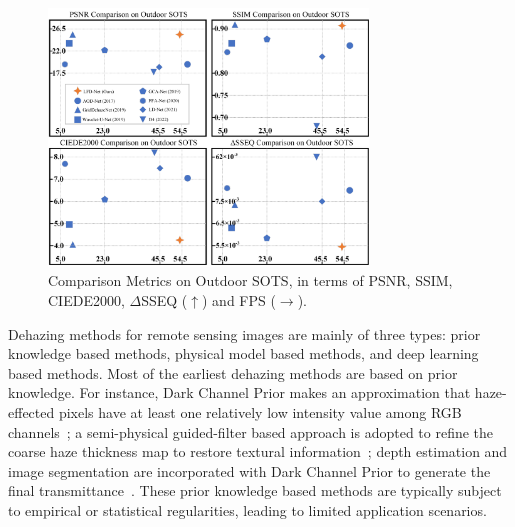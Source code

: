 \documentclass[lettersize,journal]{IEEEtran}
\begin{document}
\begin{figure}[t]
    \centering
    \includegraphics[width=8.5cm]{sample.png}
    \caption{Comparison Metrics on Outdoor SOTS, in terms of PSNR, SSIM, CIEDE2000, $\Delta$SSEQ ($\uparrow$) and FPS ($\rightarrow$).}
    \label{sample}
\end{figure}


Dehazing methods for remote sensing images are mainly of three types: prior knowledge based methods, physical model based methods, and deep learning based methods. Most of the earliest dehazing methods are based on prior knowledge. For instance, Dark Channel Prior makes an approximation that haze-effected pixels have at least one relatively low intensity value among RGB channels~\cite{li2020nasa};  a semi-physical guided-filter based approach is adopted to refine the coarse haze thickness map to restore textural information~\cite{liu2021semiphysical}; depth estimation and image segmentation are incorporated with Dark Channel Prior to generate the final transmittance~\cite{xie2021image}. These prior knowledge based methods are typically subject to empirical or statistical regularities, leading to limited application scenarios.
\end{document}

